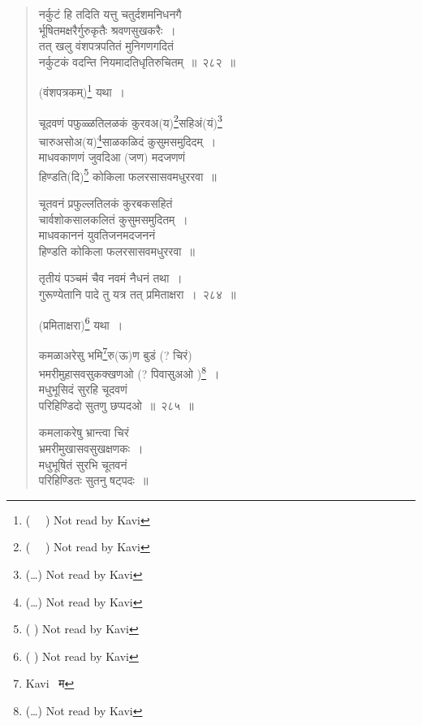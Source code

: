 \documentclass[11pt, openany]{book}
\begin{document}
\newpage

\begin{quote}
{\na नर्कुटं हि तदिति यत्तु चतुर्दशमनिधनगै\textendash \\
र्भूषितमक्षरैर्गुरुकृतैः श्रवणसुखकरैः~।\\
तत् खलु वंशपत्रपतितं मुनिगणगदितं\\
 नर्कुटकं वदन्ति नियमादतिधृतिरुचितम्~॥~२८२~॥}

(वंशपत्रकम्)\renewcommand{\thefootnote}{1}\footnote{( \textendash\ \textendash\ \textendash ) Not read by Kavi} यथा~। 

{\qt चूदवणं पफुळ्ळतिलळकं कुरवअ(य)\renewcommand{\thefootnote}{2}\footnote{( \textendash\ \textendash\ \textendash ) Not read by Kavi}सहिअं(यं)\renewcommand{\thefootnote}{3}\footnote{(\ldots ) Not read by Kavi}\\
 चारुअसोअ(य)\renewcommand{\thefootnote}{4}\footnote{(\ldots ) Not read by Kavi}साळकळिदं कुसुमसमुदिदम्~।\\
माधवकाणणं जुवदिआ (जण) मदजणणं\\
 हिण्डति(दि)\renewcommand{\thefootnote}{5}\footnote{( ) Not read by Kavi} कोकिला फलरसासवमधुररवा~॥

चूतवनं प्रफुल्लतिलकं कुरबकसहितं \\
 चार्वशोकसालकलितं कुसुमसमुदितम्~।\\
माधवकाननं युवतिजनमदजननं\\
 हिण्डति कोकिला फलरसासवमधुररवा~॥}

{\na तृतीयं पञ्चमं चैव नवमं नैधनं तथा~। \\
गुरूण्येतानि पादे तु यत्र तत् प्रमिताक्षरा~।~२८४~॥} 

(प्रमिताक्षरा)\renewcommand{\thefootnote}{6}\footnote{( ) Not read by Kavi} यथा~। 


{\na कमळाअरेसु भमि\renewcommand{\thefootnote}{7}\footnote{Kavi \textendash\ म }रु(ऊ)ण बुडं (? चिरं) \\
 भमरीमुहासवसुकक्खणओ (? पिवासुअओ )\renewcommand{\thefootnote}{8}\footnote{(\ldots ) Not read by Kavi}~।\\
मधुभूसिदं सुरहि चूदवणं\\
 परिहिण्डिदो सुतणु छप्पदओ~॥~२८५~॥}

{\qt कमलाकरेषु भ्रान्त्वा चिरं \\
 भ्रमरीमुखासवसुखक्षणकः~।\\
मधुभूषितं सुरभि चूतवनं\\
परिहिण्डितः सुतनु षट्पदः~॥}
\end{quote}

\newpage
\end{document}
